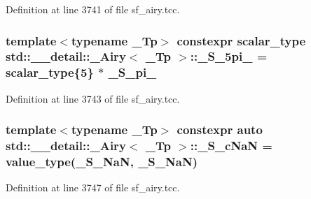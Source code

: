 Definition at line 3741 of file sf\+\_\+airy.\+tcc.

\subsubsection[{\texorpdfstring{\+\_\+\+S\+\_\+5pi\+\_\+6}{_S_5pi_6}}]{\setlength{\rightskip}{0pt plus 5cm}template$<$typename \+\_\+\+Tp$>$ constexpr {\bf scalar\+\_\+type} {\bf std\+::\+\_\+\+\_\+detail\+::\+\_\+\+Airy}$<$ \+\_\+\+Tp $>$\+::\+\_\+\+S\+\_\+5pi\+\_ = {\bf scalar\+\_\+type}\{5\} $\ast$ {\bf \+\_\+\+S\+\_\+pi\+\_}\hspace{0.3cm}{\ttfamily [static]}}\hypertarget{classstd_1_1____detail_1_1__Airy_a81972f7ec24b2d67c7bf928450a9589c}{}\label{classstd_1_1____detail_1_1__Airy_a81972f7ec24b2d67c7bf928450a9589c}


Definition at line 3743 of file sf\+\_\+airy.\+tcc.

\subsubsection[{\texorpdfstring{\+\_\+\+S\+\_\+c\+NaN}{_S_cNaN}}]{\setlength{\rightskip}{0pt plus 5cm}template$<$typename \+\_\+\+Tp$>$ constexpr auto {\bf std\+::\+\_\+\+\_\+detail\+::\+\_\+\+Airy}$<$ \+\_\+\+Tp $>$\+::\+\_\+\+S\+\_\+c\+NaN = {\bf value\+\_\+type}({\bf \+\_\+\+S\+\_\+\+NaN}, {\bf \+\_\+\+S\+\_\+\+NaN})\hspace{0.3cm}{\ttfamily [static]}}\hypertarget{classstd_1_1____detail_1_1__Airy_aee4964dc3e741181641483c6befa7338}{}\label{classstd_1_1____detail_1_1__Airy_aee4964dc3e741181641483c6befa7338}


Definition at line 3747 of file sf\+\_\+airy.\+tcc.

